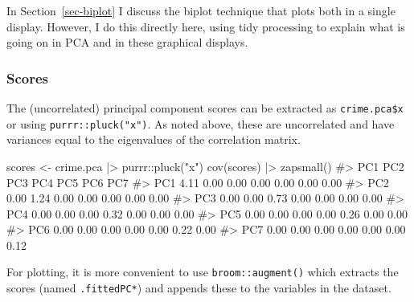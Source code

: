\documentclass[
  letterpaper,
  10pt,
  krantz2]{krantz}
\makeatletter
\newenvironment{Shaded}{\begin{snugshade}}{\end{snugshade}}
\newcommand{\CommentTok}[1]{\textcolor[rgb]{0.37,0.37,0.37}{#1}}
\newcommand{\FunctionTok}[1]{\textcolor[rgb]{0.28,0.35,0.67}{#1}}
\newcommand{\NormalTok}[1]{\textcolor[rgb]{0.00,0.23,0.31}{#1}}
\newcommand{\OtherTok}[1]{\textcolor[rgb]{0.00,0.23,0.31}{#1}}
\newcommand{\SpecialCharTok}[1]{\textcolor[rgb]{0.37,0.37,0.37}{#1}}
\newcommand{\StringTok}[1]{\textcolor[rgb]{0.13,0.47,0.30}{#1}}
\newenvironment{kframe}{%
  \medskip{}
  \setlength{\fboxsep}{.8em}
  \def\at@end@of@kframe{}%
  \ifinner\ifhmode%
  \def\at@end@of@kframe{\end{minipage}}%
  \begin{minipage}{\columnwidth}%
  \fi\fi%
  \def\FrameCommand##1{\hskip\@totalleftmargin \hskip-\fboxsep
  \colorbox{shadecolor}{##1}\hskip-\fboxsep
      \hskip-\linewidth \hskip-\@totalleftmargin \hskip\columnwidth}%
  \MakeFramed {\advance\hsize-\width
    \@totalleftmargin\z@ \linewidth\hsize
    \@setminipage}}%
{\par\unskip\endMakeFramed%
  \at@end@of@kframe}
\renewenvironment{Shaded}{\begin{kframe}}{\end{kframe}}
\makeatother
\begin{document}
In Section~\ref{sec-biplot} I discuss the biplot technique that plots
both in a single display. However, I do this directly here, using tidy
processing to explain what is going on in PCA and in these graphical
displays.

\hypertarget{scores}{%
\subsubsection*{Scores}\label{scores}}

The (uncorrelated) principal component scores can be extracted as
\texttt{crime.pca\$x} or using \texttt{purrr::pluck("x")}. As noted
above, these are uncorrelated and have variances equal to the
eigenvalues of the correlation matrix.

\begin{Shaded}
\begin{Highlighting}[]
\NormalTok{scores }\OtherTok{\textless{}{-}}\NormalTok{ crime.pca }\SpecialCharTok{|\textgreater{}}\NormalTok{ purrr}\SpecialCharTok{::}\FunctionTok{pluck}\NormalTok{(}\StringTok{"x"}\NormalTok{) }
\FunctionTok{cov}\NormalTok{(scores) }\SpecialCharTok{|\textgreater{}} \FunctionTok{zapsmall}\NormalTok{()}
\CommentTok{\#\textgreater{}      PC1  PC2  PC3  PC4  PC5  PC6  PC7}
\CommentTok{\#\textgreater{} PC1 4.11 0.00 0.00 0.00 0.00 0.00 0.00}
\CommentTok{\#\textgreater{} PC2 0.00 1.24 0.00 0.00 0.00 0.00 0.00}
\CommentTok{\#\textgreater{} PC3 0.00 0.00 0.73 0.00 0.00 0.00 0.00}
\CommentTok{\#\textgreater{} PC4 0.00 0.00 0.00 0.32 0.00 0.00 0.00}
\CommentTok{\#\textgreater{} PC5 0.00 0.00 0.00 0.00 0.26 0.00 0.00}
\CommentTok{\#\textgreater{} PC6 0.00 0.00 0.00 0.00 0.00 0.22 0.00}
\CommentTok{\#\textgreater{} PC7 0.00 0.00 0.00 0.00 0.00 0.00 0.12}
\end{Highlighting}
\end{Shaded}

For plotting, it is more convenient to use \texttt{broom::augment()}
which extracts the scores (named \texttt{.fittedPC*}) and appends these
to the variables in the dataset.
\end{document}
